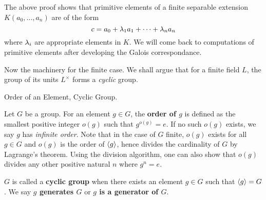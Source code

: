 \documentclass[../book.tex]{subfiles}
\begin{document}
\begin{rmk}
    The above proof shows that primitive elements of a finite separable extension
    $K(a_0,\dots,a_{n})$ are of the form \[
        c = a_0 + \lambda_1 a_1 + \cdots + \lambda_n a_n
    \]
    where $\lambda_i$ are appropriate elements in $K$. 
    We will come back to computations of primitive elements 
    after developing the Galois correspondance. 
\end{rmk}

Now the machinery for the finite case. 
We shall argue that for a finite field $L$, 
the group of its units $L^\times$ forms a \emph{cyclic} group. 

\begin{dfn} Order of an Element, Cyclic Group.
    
    Let $G$ be a group. 
    For an element $g \in G$, the \textbf{order of $g$} is defined as 
    the smallest positive integer $o(g)$ such that $g^{o(g)} = e$. 
    If no such $o(g)$ exists, we say $g$ has \emph{infinite order}. 
    Note that in the case of $G$ finite, 
    $o(g)$ exists for all $g \in G$ and $o(g)$ is the order of $\langle g\rangle$,
    hence divides the cardinality of $G$ by Lagrange's theorem. 
    Using the division algorithm, one can also show that $o(g)$
    divides any other positive natural $n$ where $g^n = e$. 
    
    $G$ is called a \textbf{cyclic group} when 
    there exists an element $g \in G$ such that $\langle g\rangle = G$. 
    We say \textbf{$g$ generates $G$} or \textbf{$g$ is a generator of $G$}.
\end{dfn}
\end{document}
